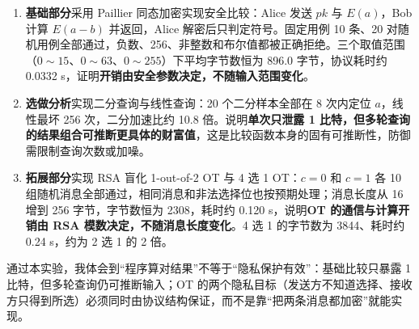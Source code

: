 \documentclass{SYSUReport}
\begin{document}
\begin{enumerate}
  \item \textbf{基础部分}采用 Paillier 同态加密实现安全比较：Alice 发送 $pk$ 与 $E(a)$，Bob 计算 $E(a-b)$ 并返回，Alice 解密后只判定符号。固定用例 10 条、20 对随机用例全部通过，负数、256、非整数和布尔值都被正确拒绝。三个取值范围（$0\sim15$、$0\sim63$、$0\sim255$）下平均字节数恒为 896.0 字节，协议耗时约 0.0332 s，证明\textbf{开销由安全参数决定，不随输入范围变化}。
  \item \textbf{选做分析}实现二分查询与线性查询：20 个二分样本全部在 8 次内定位 $a$，线性最坏 256 次，二分加速比约 10.8 倍。说明\textbf{单次只泄露 1 比特，但多轮查询的结果组合可推断更具体的财富值}，这是比较函数本身的固有可推断性，防御需限制查询次数或加噪。
  \item \textbf{拓展部分}实现 RSA 盲化 1-out-of-2 OT 与 4 选 1 OT：$c=0$ 和 $c=1$ 各 10 组随机消息全部通过，相同消息和非法选择位也按预期处理；消息长度从 16 增到 256 字节，字节数恒为 2308，耗时约 0.120 s，说明\textbf{OT 的通信与计算开销由 RSA 模数决定，不随消息长度变化}。4 选 1 的字节数为 3844、耗时约 0.24 s，约为 2 选 1 的 2 倍。
\end{enumerate}

通过本实验，我体会到“程序算对结果”不等于“隐私保护有效”：基础比较只暴露 1 比特，但多轮查询仍可推断输入；OT 的两个隐私目标（发送方不知道选择、接收方只得到所选）必须同时由协议结构保证，而不是靠“把两条消息都加密”就能实现。


\nocite{*}

\end{document}
